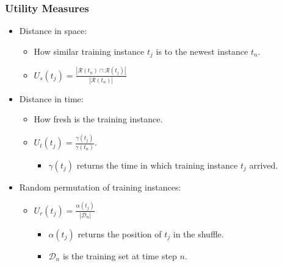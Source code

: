 \documentclass[14pt]{beamer}
\begin{document}
\begin{frame}\frametitle{Utility Measures}
\begin{itemize}
\item Distance in space:
\begin{itemize}
\item How similar training instance $t_j$ is to the newest instance $t_n$.
\item $U_s(t_j)=\frac{|\mathcal{R}(t_n) \cap \mathcal{R}(t_j)|}{|\mathcal{R}(t_n)|}$
\end{itemize}
\item Distance in time:
\begin{itemize}
\item How fresh is the training instance.
\item $U_t(t_j)=\frac{\gamma(t_j)}{\gamma(t_n)}$.
\begin{itemize}
\item $\gamma(t_j)$ returns the time in which training instance $t_j$ arrived.
\end{itemize}
\end{itemize}
\item Random permutation of training instances:
\begin{itemize}
\item $U_r(t_j)=\frac{\alpha(t_j)}{|\mathcal{D}_n|}$
\begin{itemize}
\item $\alpha(t_j)$ returns the position of $t_j$ in the shuffle.
\item $\mathcal{D}_n$ is the training set at time step $n$.
\end{itemize}
\end{itemize}
\end{itemize}

\end{frame}
\end{document}
